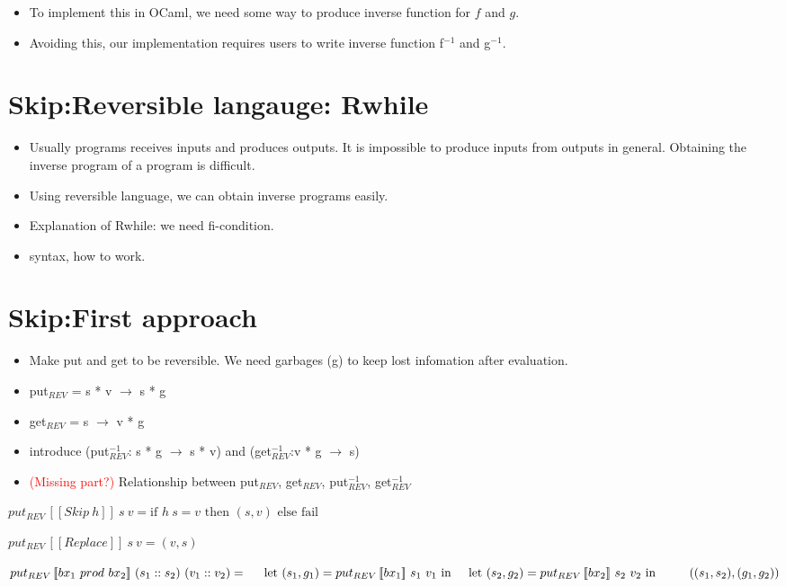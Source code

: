 \documentclass[runningheads]{llncs}
\newcommand{\tab}{\hspace*{5mm}}
\newcommand{\qtab}{\hspace*{5mm} \ \quad}
\newcommand{\sif}[3]{\text{if } #1 \text{ then } #2 \text{ else } #3}
\newcommand{\product}[2]{#1 \ prod \ #2}
\newcommand{\tuple}[2]{(#1 :: #2)}
\newcommand{\putrev}[3]{put_{REV} \, [\![#1]\!] \ {#2} \ {#3}}
\begin{document}
\begin{itemize}
\item To implement this in OCaml, we need some way to produce inverse function for $f$ and $g$.
\item Avoiding this, our implementation requires users to write inverse function f$^{-1}$ and g$^{-1}$.
\end{itemize}

\section{Skip:Reversible langauge: Rwhile}


\begin{itemize}
\item Usually programs receives inputs and produces outputs. It is impossible to produce inputs from outputs in general. Obtaining the inverse program of a program is difficult.
\item Using reversible language, we can obtain inverse programs easily.
\item Explanation of Rwhile: we need fi-condition.
\item syntax, how to work.
\end{itemize}

\section{Skip:First approach}


\begin{itemize}
\item Make put and get to be reversible. We need garbages (g) to keep lost infomation after evaluation.
\item put$_{REV}$ = s * v $\to$ s * g
\item get$_{REV}$ = s $\to$ v * g
\item introduce (put$_{REV}^{-1}$: s * g $\to$ s * v) and (get$_{REV}^{-1}$:v * g $\to$ s)
\item \textcolor{red}{(Missing part?)} Relationship between put$_{REV}$, get$_{REV}$, put$_{REV}^{-1}$, get$_{REV}^{-1}$ 
\end{itemize}

$\putrev{Skip \ h}{s}{v} =  \sif{h \ s = v}{(s, v)}{\text{fail}}$

$\putrev{Replace}{s}{v} = (v, s)$

$\putrev{\product{bx_1}{bx_2}}{\tuple{s_1}{s_2}}{\tuple{v_1}{v_2}} =\\
    \tab \text{let} \ (s_1, g_1) = \putrev{bx_1}{s_1}{v_1} \ \text{in}\\
    \tab \text{let} \ (s_2, g_2) = \putrev{bx_2}{s_2}{v_2} \ \text{in}\\
        \qtab ((s_1, s_2), (g_1, g_2))$
\end{document}
